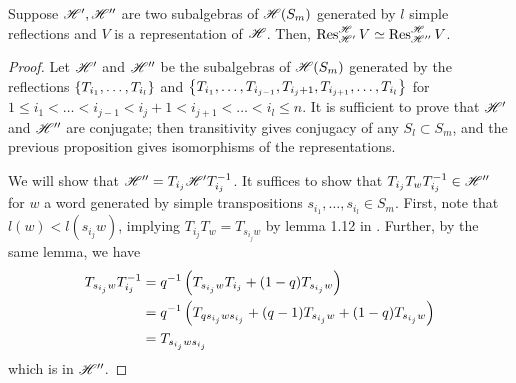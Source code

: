 \documentclass{amsart}
\begin{document}
\begin{corollary}
  Suppose $\mathscr{H}',\mathscr{H}''$ are two subalgebras of $\mathscr{H}(S_m)$ generated by $l$ simple reflections and $V$ is a representation of $\mathscr{H}$.
  Then, $\operatorname{Res}_{\mathscr{H}'}^{\mathscr{H}} V \simeq \operatorname{Res}_{\mathscr{H}''}^{\mathscr{H}} V$.
\end{corollary}
\begin{proof}
  Let $\mathscr{H}'$ and $\mathscr{H}''$ be the subalgebras of $\mathscr{H}(S_m)$ generated by the reflections $\left\{ T_{i_1},\dots,T_{i_l} \right\}$ and $\left\{ T_{i_1},\dots,T_{i_{j-1}},T_{i_j + 1},T_{i_{j+1}},\dots,T_{i_l} \right\}$ for $1 \leq i_1 < \dots < i_{j-1} < i_j + 1 < i_{j+1} < \dots < i_l \leq n$.
  It is sufficient to prove that $\mathscr{H}'$ and $\mathscr{H}''$ are conjugate;
  then transitivity gives conjugacy of any $S_l \subset S_m$, and the previous proposition gives isomorphisms of the representations.
 
  We will show that $\mathscr{H}'' = T_{i_j}\mathscr{H}'T_{i_j}^{-1}$.
  It suffices to show that $T_{i_j}T_wT_{i_j}^{-1} \in \mathscr{H}''$ for $w$ a word generated by simple transpositions $s_{i_1},\dots,s_{i_{l}} \in S_m$.
  First, note that $l(w) < l(s_{i_j}w)$, implying $T_{i_j}T_w = T_{s_{i_j}w}$ by lemma 1.12 in \cite{Mathas-book}.
  Further, by the same lemma, we have
  \begin{align*}
    T_{s_{i_j}w}T_{i_j}^{-1} 
    &= q^{-1}\left( T_{s_{i_j}w}T_{i_j} + (1-q)T_{s_{i_j}w} \right)\\
    &= q^{-1}\left( T_{qs_{i_j}ws_{i_j}} + (q-1)T_{s_{i_j}w} + (1-q)T_{s_{i_j}w} \right)\\
    &= T_{s_{i_j}ws_{i_j}}
  \end{align*}
  which is in $\mathscr{H}''$.
\end{proof}
\end{document}
